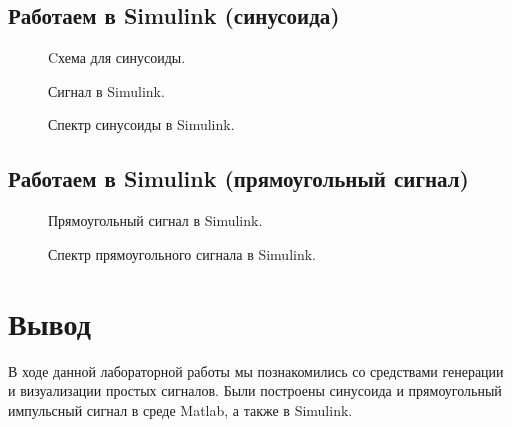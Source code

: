 \documentclass[12pt,a4paper]{scrartcl}
\begin{document}
\newpage
\subsection{Работаем в Simulink (синусоида)}
\label{sec:workSim1}

\begin{figure}[h!]
\caption{Cхема для синусоиды.}
\end{figure}

\begin{figure}[h!]
\caption{Сигнал в Simulink.}
\end{figure}

\begin{figure}[h!]
\caption{Спектр синусоиды в Simulink.}
\end{figure}

\clearpage
\newpage
\subsection{Работаем в Simulink (прямоугольный сигнал)}
\label{sec:workSim2}


\begin{figure}[h!]
\caption{Прямоугольный сигнал в Simulink.}
\end{figure}

\begin{figure}[h!]
\caption{Спектр прямоугольного сигнала в Simulink.}
\end{figure}

\clearpage
\newpage

\section{Вывод}
\label{sec:afterWork}
В ходе данной лабораторной работы мы познакомились со средствами генерации и визуализации простых сигналов. Были построены синусоида и прямоугольный импульсный сигнал в среде Matlab, а также в Simulink.
\end{document}
